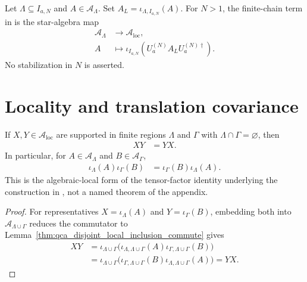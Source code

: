 \begin{definition}
    \label{def:mpu_finite_chain_local_observable}
    \leanok
    Let $\Lambda\subseteq I_{a,N}$ and $A\in\mathcal A_\Lambda$.  Set
    $A_L=\iota_{\Lambda,I_{a,N}}(A)$.  For $N>1$, the finite-chain term in
    \cite[lines~2300--2306]{Cirac2017MPU} is the star-algebra map
    \begin{align}
        \mathcal A_\Lambda & \longrightarrow\mathcal A_{\mathrm{loc}}, \\
        A                  & \longmapsto
        \iota_{I_{a,N}}\!\left(U_a^{(N)}A_LU_a^{(N)\dagger}\right).
    \end{align}
    No stabilization in $N$ is asserted.
\end{definition}

\section{Locality and translation covariance}

\begin{lemma}
    \label{thm:qca_disjoint_supported_local_commute}
    \leanok
    If $X,Y\in\mathcal A_{\mathrm{loc}}$ are supported in finite regions
    $\Lambda$ and $\Gamma$ with $\Lambda\cap\Gamma=\varnothing$, then
    \begin{align}
        XY & =YX.
    \end{align}
    In particular, for $A\in\mathcal A_\Lambda$ and
    $B\in\mathcal A_\Gamma$,
    \begin{align}
        \iota_\Lambda(A)\iota_\Gamma(B)
         & =\iota_\Gamma(B)\iota_\Lambda(A).
    \end{align}
    This is the algebraic-local form of the tensor-factor identity underlying
    the construction in \cite[lines~2292--2300]{Cirac2017MPU}, not a named
    theorem of the appendix.
\end{lemma}

\begin{proof}\leanok
    For representatives $X=\iota_\Lambda(A)$ and
    $Y=\iota_\Gamma(B)$, embedding both into
    $\mathcal A_{\Lambda\cup\Gamma}$ reduces the commutator to
    Lemma~\ref{thm:qca_disjoint_local_inclusion_commute} gives
    \begin{align}
        XY
         & =\iota_{\Lambda\cup\Gamma}
        \bigl(\iota_{\Lambda,\Lambda\cup\Gamma}(A)
        \iota_{\Gamma,\Lambda\cup\Gamma}(B)\bigr) \\
         & =\iota_{\Lambda\cup\Gamma}
        \bigl(\iota_{\Gamma,\Lambda\cup\Gamma}(B)
        \iota_{\Lambda,\Lambda\cup\Gamma}(A)\bigr)
        =YX.
    \end{align}
\end{proof}

